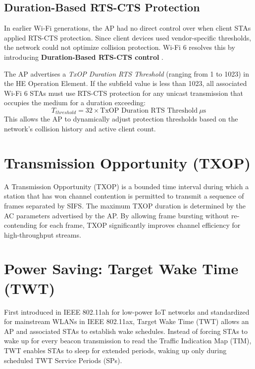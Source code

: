 \subsection{Duration-Based RTS-CTS Protection}
In earlier Wi-Fi generations, the AP had no direct control over when client STAs applied RTS-CTS protection. Since client devices used vendor-specific thresholds, the network could not optimize collision protection. Wi-Fi 6 resolves this by introducing \textbf{Duration-Based RTS-CTS control} \cite{gulasekaran2021wifi6}.

The AP advertises a \textit{TxOP Duration RTS Threshold} (ranging from 1 to 1023) in the HE Operation Element. If the subfield value is less than 1023, all associated Wi-Fi 6 STAs must use RTS-CTS protection for any unicast transmission that occupies the medium for a duration exceeding:
\begin{equation}
    T_{threshold} = 32 \times \text{TxOP Duration RTS Threshold}~\mu\text{s}
\end{equation}
This allows the AP to dynamically adjust protection thresholds based on the network's collision history and active client count.

\section{Transmission Opportunity (TXOP)}
A Transmission Opportunity (TXOP) is a bounded time interval during which a station that has won channel contention is permitted to transmit a sequence of frames separated by SIFS. The maximum TXOP duration is determined by the AC parameters advertised by the AP. By allowing frame bursting without re-contending for each frame, TXOP significantly improves channel efficiency for high-throughput streams.

\section{Power Saving: Target Wake Time (TWT)}
First introduced in IEEE 802.11ah for low-power IoT networks and standardized for mainstream WLANs in IEEE 802.11ax, Target Wake Time (TWT) allows an AP and associated STAs to establish wake schedules. Instead of forcing STAs to wake up for every beacon transmission to read the Traffic Indication Map (TIM), TWT enables STAs to sleep for extended periods, waking up only during scheduled TWT Service Periods (SPs).

